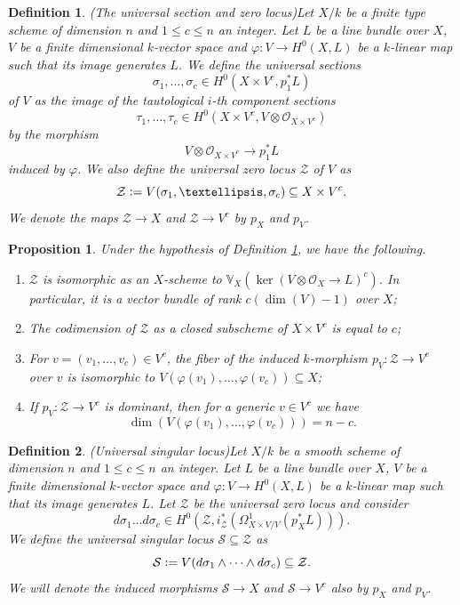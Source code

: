 \documentclass[10pt,a4paper]{amsart}
\newtheorem{definition}{Definition}
\newtheorem{proposition}{Proposition}
\newcommand{\defeq}{\vcentcolon=}
\renewcommand{\leq}{\leqslant}
\begin{document}
\begin{definition}{(The universal section and zero locus)}\label{universal locus def}
Let $X/k$ be a finite type scheme of dimension $n$ and $1\leq c\leq n$ an integer. Let $L$ be a line bundle over $X$, $V$ be a finite dimensional $k$-vector space and $\varphi\colon V\to H^{0}(X,L)$ be a $k$-linear map such that its image generates $L$. We define the universal sections
    \[
    \sigma_{1},\dots, \sigma_{c}\in H^{0}(X\times V^{c}, p_{1}^{\ast}L)
    \]
    of $V$ as the image of the tautological $i$-th component sections 
    \[
    \tau_{1},\dots,\tau_{c}\in H^{0}(X\times V^{c}, V\otimes \mathcal{O}_{X\times V^{c}})
    \]
    by the morphism
    \[
    V\otimes \mathcal{O}_{X\times V^{c}}\to p_{1}^{\ast}L
    \]
    induced by $\varphi$. We also define the universal zero locus $\mathcal{Z}$ of $V$ as
    \[
    \mathcal{Z}\defeq V(\sigma_{1},\dots, \sigma_{c})\subseteq X\times V^{c}.
    \]
    We denote the maps $\mathcal{Z}\to X$ and $\mathcal{Z}\to V^{c}$ by $p_{X}$ and $p_{V}$.
\end{definition}

\begin{proposition}\label{universal locus prop}
Under the hypothesis of Definition \ref{universal locus def}, we have the following.
    \begin{enumerate}
        \item $\mathcal{Z}$ is isomorphic as an $X$-scheme to $\mathbb{V}_{X}(\ker(V\otimes\mathcal{O}_{X}\to L)^{c})$. In particular, it is a vector bundle of rank $c(\dim(V)-1)$ over $X$;
        \item The codimension of $\mathcal{Z}$ as a closed subscheme of $X\times V^{c}$ is equal to $c$;
        \item For $v=(v_{1},\dots, v_{c})\in V^{c}$, the fiber of the induced $k$-morphism $p_{V}\colon \mathcal{Z}\to V^{c}$ over $v$ is isomorphic to $V(\varphi(v_{1}),\dots, \varphi(v_{c}))\subseteq X$;
        \item If $p_{V}\colon \mathcal{Z}\to V^{c}$ is dominant, then for a generic $v\in V^{c}$ we have
        \[
        \dim(V(\varphi(v_{1}),\dots, \varphi(v_{c})))=n-c.
        \]
    \end{enumerate}
\end{proposition}

\begin{definition}{(Universal singular locus)}\label{singular locus def}
    Let $X/k$ be a smooth scheme of dimension $n$ and $1\leq c\leq n$ an integer. Let $L$ be a line bundle over $X$, $V$ be a finite dimensional $k$-vector space and $\varphi\colon V\to H^{0}(X,L)$ be a $k$-linear map such that its image generates $L$. Let $\mathcal{Z}$ be the universal zero locus and consider
    \[
    d\sigma_{1}\dots d\sigma_{c}\in H^{0}(\mathcal{Z},i_{\mathcal{Z}}^{\ast}(\Omega^{1}_{X\times V/V}(p_{X}^{\ast}L))).
    \]
    We define the universal singular locus $\mathcal{S}\subseteq \mathcal{Z}$ as
    \[
    \mathcal{S}\defeq V(d\sigma_{1}\wedge\cdots\wedge d\sigma_{c})\subseteq \mathcal{Z}.
    \]
    We will denote the induced morphisms $\mathcal{S}\to X$ and $\mathcal{S}\to V^{c}$ also by $p_{X}$ and $p_{V}$.
\end{definition}
\end{document}
